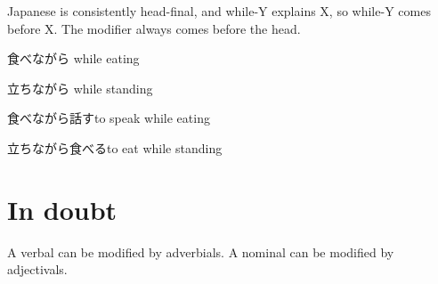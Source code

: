Japanese is consistently head-final,
and while-Y explains X,
so while-Y comes before X.
The modifier always comes before the head.

食べながら while eating

立ちながら while standing

食べながら話すto speak while eating

立ちながら食べるto eat while standing

\section{In doubt}

A verbal can be modified by adverbials.
A nominal can be modified by adjectivals.
